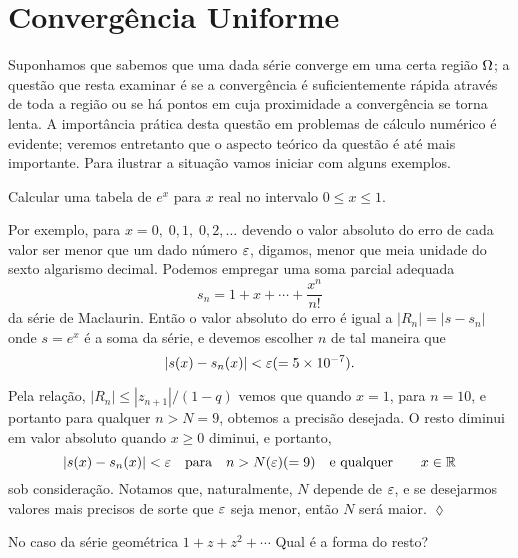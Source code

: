 \section{Converg\^{e}ncia Uniforme}

Suponhamos que sabemos que uma dada s\'{e}rie converge em uma certa
regi\~{a}o $\Omega$; a quest\~{a}o que resta examinar \'{e} se a converg\^{e}ncia \'{e}
suficientemente r\'{a}pida atrav\'{e}s de toda a regi\~{a}o ou se h\'{a} pontos em
cuja proximidade a converg\^{e}ncia se torna lenta. A import\^{a}ncia
pr\'{a}tica desta quest\~{a}o em problemas de c\'{a}lculo num\'{e}rico \'{e} evidente;
veremos entretanto que o aspecto te\'{o}rico da quest\~{a}o \'{e} at\'{e} mais
importante. Para ilustrar a situa\c{c}\~{a}o vamos iniciar com alguns
exemplos.

\begin{exer}\label{ex144:1}
Calcular uma tabela de $e^x$ para $x$ real no intervalo $0\le x
\le 1$.
\end{exer}

\solo Por exemplo, para $x= 0,\; 0,1,\; 0,2,\ldots$ devendo o
valor absoluto do erro de cada valor ser menor que um dado n\'{u}mero
$\varepsilon$, digamos, menor que meia unidade do sexto algarismo
decimal. Podemos empregar uma soma parcial adequada
\begin{equation*}
s_n= 1 +x +\cdots + \frac{x^n}{n!}
\end{equation*}
da s\'{e}rie de Maclaurin. Ent\~{a}o o valor absoluto do erro \'{e} igual a
$|R_n|=|s - s_n|$ onde $s=e^x$ \'{e} a soma da s\'{e}rie, e devemos
escolher $n$ de tal maneira que
\begin{equation*}
|s(x) - s_n(x)| < \varepsilon (= 5\times 10^{-7}).
\end{equation*}

Pela rela\c{c}\~{a}o, $|R_n|\leq |z_{n+1}|/(1-q)$ vemos que quando $x =
1$, para $n=10$, e portanto para qualquer $n > N = 9$, obtemos a
precis\~{a}o desejada. O resto diminui em valor absoluto quando $x\geq
0$ diminui, e portanto,
\begin{equation*}
| s(x) - s_n(x)| < \varepsilon \quad \text{para}\quad  n > N(\varepsilon) (=
9)\quad\text{e qualquer}\qquad x \in \mathbb{R}
\end{equation*}
sob considera\c{c}\~{a}o. Notamos que, naturalmente, $N$ depende de
$\varepsilon$, e se desejarmos valores mais precisos de sorte que $\varepsilon$
seja menor, ent\~{a}o $N$ ser\'{a} maior. \hfill \(\lozenge\)


\begin{exer}\label{ex144:2}
No caso da s\'{e}rie geom\'{e}trica $1 + z + z^2+\cdots$ Qual \'{e} a forma do resto?
\end{exer}

